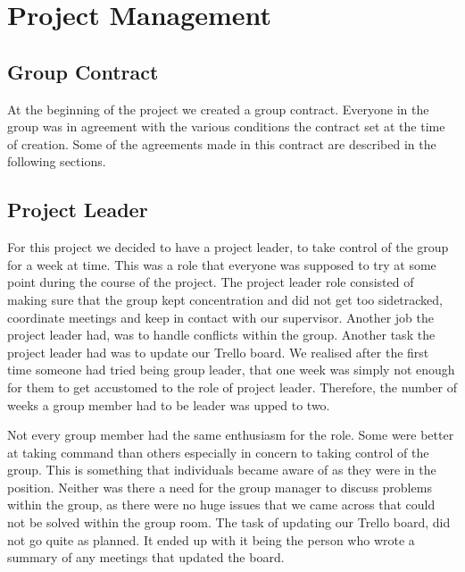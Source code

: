 \section{Project Management}
\subsection{Group Contract}
At the beginning of the project we created a group contract. 
Everyone in the group was in agreement with the various conditions the contract set at the time of creation. 
Some of the agreements made in this contract are described in the following sections.

\subsection{Project Leader}
For this project we decided to have a project leader, to take control of the group for a week at time. 
This was a role that everyone was supposed to try at some point during the course of the project. 
The project leader role consisted of making sure that the group kept concentration and did not get too sidetracked, coordinate meetings and keep in contact with our supervisor. 
Another job the project leader had, was to handle conflicts within the group. 
Another task the project leader had was to update our Trello board.
We realised after the first time someone had tried being group leader, that one week was simply not enough for them to get accustomed to the role of project leader.
Therefore, the number of weeks a group member had to be leader was upped to two.

Not every group member had the same enthusiasm for the role. 
Some were better at taking command than others especially in concern to taking control of the group.
This is something that individuals became aware of as they were in the position.
Neither was there a need for the group manager to discuss problems within the group, as there were no huge issues that we came across that could not be solved within the group room.
The task of updating our Trello board, did not go quite as planned. 
It ended up with it being the person who wrote a summary of any meetings that updated the board.

